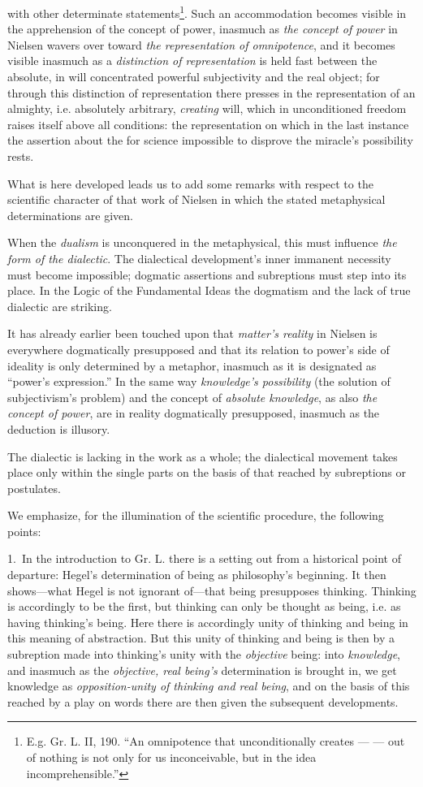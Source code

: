 \documentclass[12pt,a4paper]{book}
\begin{document}
with other determinate statements\footnote{E.g. Gr. L. II, 190. ``An omnipotence that unconditionally creates
--- --- out of nothing is not only for us inconceivable, but in the idea incomprehensible.''}. Such an
accommodation becomes visible in the apprehension of the concept of power, inasmuch as \emph{the concept of
power} in Nielsen wavers over toward \emph{the representation of omnipotence}, and it becomes visible inasmuch
as a \emph{distinction of representation} is held fast between the absolute, in will concentrated powerful
subjectivity and the real object; for through this distinction of representation there presses in the
representation of an almighty, i.e. absolutely arbitrary, \emph{creating} will, which in unconditioned freedom raises
itself above all conditions: the representation on which in the last instance the assertion about the for
science impossible to disprove the miracle's possibility rests.

What is here developed leads us to add some remarks with respect to the scientific character of that work of
Nielsen in which the stated metaphysical determinations are given.

When the \emph{dualism} is unconquered in the metaphysical, this must influence \emph{the form of the
dialectic}. The dialectical development's inner immanent necessity must become impossible; dogmatic
assertions and subreptions must step into its place. In the Logic of the Fundamental Ideas the dogmatism and
the lack of true dialectic are striking.

It has already earlier been touched upon that \emph{matter's reality} in Nielsen is everywhere dogmatically
presupposed and that its relation to power's side of ideality is only determined by a metaphor, inasmuch as it
is designated as ``power's expression.'' In the same way \emph{knowledge's possibility} (the solution of
subjectivism's problem) and the concept of \emph{absolute knowledge}, as also \emph{the concept of power}, are
in reality dogmatically presupposed, inasmuch as the deduction is illusory.

The dialectic is lacking in the work as a whole; the dialectical movement takes place only within the single
parts on the basis of that reached by subreptions or postulates.

We emphasize, for the illumination of the scientific procedure, the following points:

1.~In the introduction to Gr. L. there is a setting out from a historical point of departure: Hegel's
determination of being as philosophy's beginning. It then shows---what Hegel is not ignorant of---that being
presupposes thinking. Thinking is accordingly to be the first, but thinking can only be thought as being, i.e.
as having thinking's being. Here there is accordingly unity of thinking and being in this meaning of
abstraction. But this unity of thinking and being is then by a subreption made into thinking's unity with the
\emph{objective} being: into \emph{knowledge}, and inasmuch as the \emph{objective, real being's} determination is
brought in, we get knowledge as \emph{opposition-unity of thinking and real being}, and on the basis of this
reached by a play on words there are then given the subsequent developments.
\end{document}
